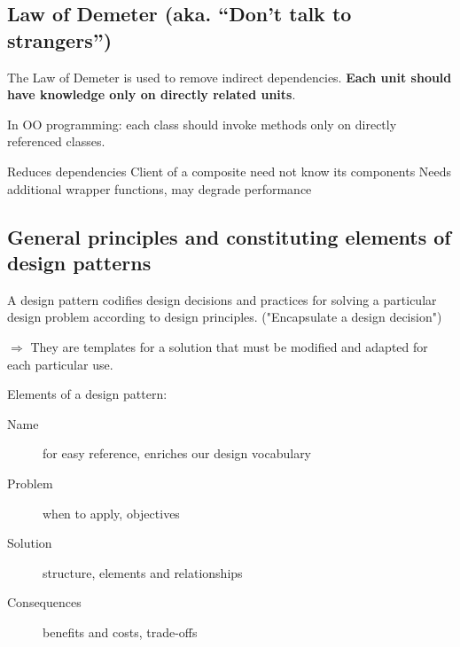 \subsection{Law of Demeter (aka. \enquote{Don't talk to strangers})}

The Law of Demeter is used to remove indirect dependencies. \textbf{Each unit
should have knowledge only on directly related units}. \newline

In OO programming: each class should invoke methods only on directly
referenced classes.

\begin{itemize}
        \proitem{} Reduces dependencies
        \proitem{} Client of a composite need not know its components
        \consitem{} Needs additional wrapper functions, may degrade performance
\end{itemize}

\subsection{General principles and constituting elements of design patterns}

A design pattern codifies design decisions and practices for solving a
particular design problem according to design principles. ("Encapsulate
a design decision")

$\Rightarrow$  They are templates for a solution that must be modified and adapted for
each particular use. 
\newline

Elements of a design pattern:

\begin{description}
    \item[Name] for easy reference, enriches our design vocabulary
    \item[Problem] when to apply, objectives
    \item[Solution] structure, elements and relationships
    \item[Consequences] benefits and costs, trade-offs
\end{description}


